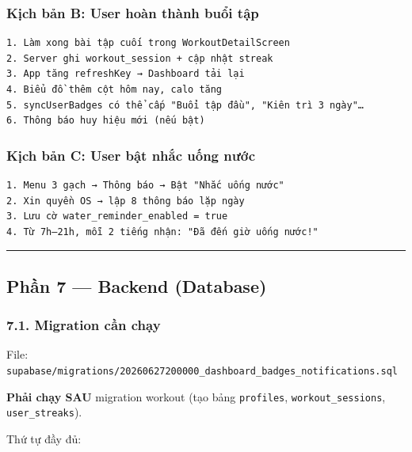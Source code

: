 \documentclass[12pt,a4paper]{article}
\begin{document}
\subsubsection{Kịch bản B: User hoàn thành buổi
tập}\label{kux1ecbch-bux1ea3n-b-user-houxe0n-thuxe0nh-buux1ed5i-tux1eadp}

\begin{verbatim}
1. Làm xong bài tập cuối trong WorkoutDetailScreen
2. Server ghi workout_session + cập nhật streak
3. App tăng refreshKey → Dashboard tải lại
4. Biểu đồ thêm cột hôm nay, calo tăng
5. syncUserBadges có thể cấp "Buổi tập đầu", "Kiên trì 3 ngày"…
6. Thông báo huy hiệu mới (nếu bật)
\end{verbatim}

\subsubsection{Kịch bản C: User bật nhắc uống
nước}\label{kux1ecbch-bux1ea3n-c-user-bux1eadt-nhux1eafc-uux1ed1ng-nux1b0ux1edbc}

\begin{verbatim}
1. Menu 3 gạch → Thông báo → Bật "Nhắc uống nước"
2. Xin quyền OS → lập 8 thông báo lặp ngày
3. Lưu cờ water_reminder_enabled = true
4. Từ 7h–21h, mỗi 2 tiếng nhận: "Đã đến giờ uống nước!"
\end{verbatim}

\begin{center}\rule{0.5\linewidth}{0.5pt}\end{center}

\subsection{Phần 7 --- Backend
(Database)}\label{phux1ea7n-7-backend-database}

\subsubsection{7.1. Migration cần
chạy}\label{migration-cux1ea7n-chux1ea1y}

File:
\texttt{supabase/migrations/20260627200000\_dashboard\_badges\_notifications.sql}

\textbf{Phải chạy SAU} migration workout (tạo bảng \texttt{profiles},
\texttt{workout\_sessions}, \texttt{user\_streaks}).

Thứ tự đầy đủ:
\end{document}
